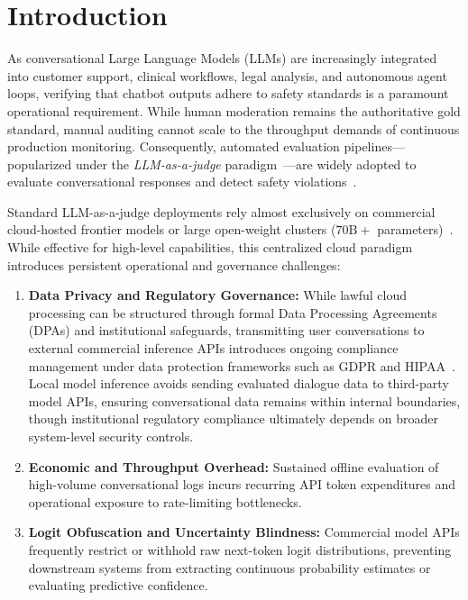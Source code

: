 \section{Introduction}
\label{sec:introduction}

As conversational Large Language Models (LLMs) are increasingly integrated into customer support, clinical workflows, legal analysis, and autonomous agent loops, verifying that chatbot outputs adhere to safety standards is a paramount operational requirement. While human moderation remains the authoritative gold standard, manual auditing cannot scale to the throughput demands of continuous production monitoring. Consequently, automated evaluation pipelines—popularized under the \textit{LLM-as-a-judge} paradigm~\cite{chiang2023vicuna,zheng2023judging,wang2023pandalm}—are widely adopted to evaluate conversational responses and detect safety violations~\cite{zhang2024safetybench,mazeika2024harmbench}.

Standard LLM-as-a-judge deployments rely almost exclusively on commercial cloud-hosted frontier models or large open-weight clusters ($70\text{B}+$ parameters)~\cite{touvron2023llama,tan2025judgebench,bavaresco2025llms}. While effective for high-level capabilities, this centralized cloud paradigm introduces persistent operational and governance challenges:
\begin{enumerate}
    \item \textbf{Data Privacy and Regulatory Governance:} While lawful cloud processing can be structured through formal Data Processing Agreements (DPAs) and institutional safeguards, transmitting user conversations to external commercial inference APIs introduces ongoing compliance management under data protection frameworks such as GDPR and HIPAA~\cite{debenedetti2024evading}. Local model inference avoids sending evaluated dialogue data to third-party model APIs, ensuring conversational data remains within internal boundaries, though institutional regulatory compliance ultimately depends on broader system-level security controls.
    \item \textbf{Economic and Throughput Overhead:} Sustained offline evaluation of high-volume conversational logs incurs recurring API token expenditures and operational exposure to rate-limiting bottlenecks.
    \item \textbf{Logit Obfuscation and Uncertainty Blindness:} Commercial model APIs frequently restrict or withhold raw next-token logit distributions, preventing downstream systems from extracting continuous probability estimates or evaluating predictive confidence.
\end{enumerate}

